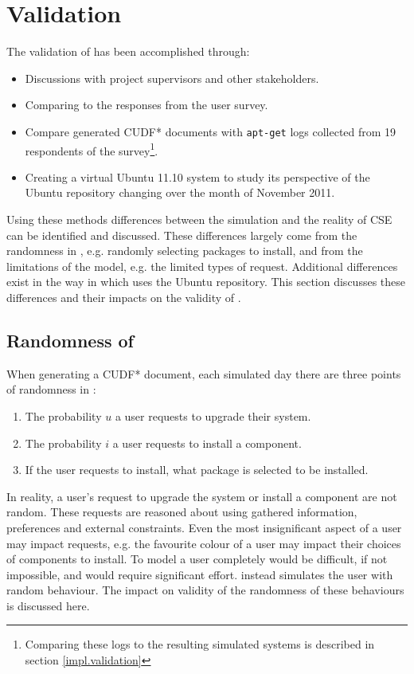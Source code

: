 \section{\usermodel Validation}
\label{sim.modelvalidation}
The validation of \usermodel has been accomplished through:
\begin{itemize}
  \item Discussions with project supervisors and other stakeholders.
  \item Comparing \usermodel to the responses from the user survey.
  \item Compare generated CUDF* documents with \texttt{apt-get} logs collected from 19 
  respondents of the survey\footnote{Comparing these logs to the resulting simulated systems is described in section \ref{impl.validation}}.
  \item Creating a virtual Ubuntu 11.10 system to study its perspective of the Ubuntu repository changing over the month of November 2011.
\end{itemize}

Using these methods differences between the simulation and the reality of CSE can be identified and discussed.
These differences largely come from the randomness in \usermodel, e.g. randomly selecting packages to install,
and from the limitations of the model, e.g. the limited types of request.
Additional differences exist in the way in which \usermodel uses the Ubuntu repository.
This section discusses these differences and their impacts on the validity of \usermodel.

\subsection{Randomness of \usermodel}
\label{sim.randomness}
When generating a CUDF* document, each simulated day there are three points of randomness in \usermodel:
\begin{enumerate}
  \item The probability $u$ a user requests to upgrade their system.
  \item The probability $i$ a user requests to install a component.
  \item If the user requests to install, what package is selected to be installed.
\end{enumerate}
In reality, a user's request to upgrade the system or install a component are not random.
These requests are reasoned about using gathered information, preferences and external constraints.
Even the most insignificant aspect of a user may impact requests, e.g. the favourite colour of a user may impact their choices of components to install.
To model a user completely would be difficult, if not impossible, and would require significant effort.
\usermodel instead simulates the user with random behaviour.
The impact on validity of the randomness of these behaviours is discussed here.

